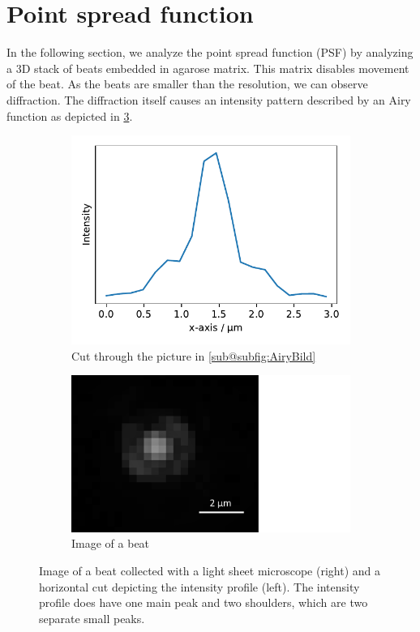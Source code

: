 \section{Point spread function}
\label{sec:PSF}

In the following section, we analyze the point spread function (PSF) by analyzing a 3D stack of 
beats embedded in agarose matrix. This matrix disables movement of the beat. 
As the beats are smaller than the resolution, we can observe diffraction. The diffraction itself 
causes an intensity pattern described by an Airy function as depicted in \cref{fig:Airy}. 

\begin{figure}[h]
    \centering
    \begin{subfigure}{0.51\linewidth}
        \centering
        \includegraphics[width = \textwidth]{Bilder/PSF/Airy.pdf}
        \caption{Cut through the picture in \ref*{sub@subfig:AiryBild}}
        \label{subfig:Airy}
    \end{subfigure}
    \hfill
    \begin{subfigure}{0.43\linewidth}
        \centering
        \includegraphics[width = \textwidth]{Bilder/PSF/2DBeugung_cropped.pdf}
        \caption{Image of a beat}
        \label{subfig:AiryBild}
    \end{subfigure}
    \caption{Image of a beat collected with a light sheet microscope (right) and a horizontal cut depicting the intensity profile (left). The intensity profile does have one main peak and two shoulders, which are two separate small peaks.}
    \label{fig:Airy}
\end{figure}